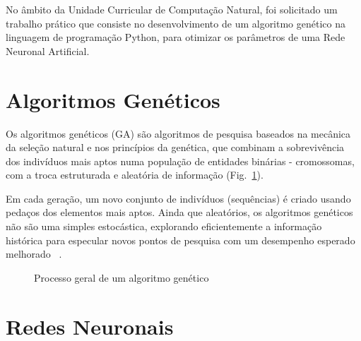 No âmbito da Unidade Curricular de Computação Natural, foi solicitado um trabalho prático que consiste no desenvolvimento de um algoritmo genético na linguagem de programação Python, para otimizar os parâmetros de uma Rede Neuronal Artificial.


\section{Algoritmos Genéticos}\label{sec:gen_algs}

Os algoritmos genéticos (GA) são algoritmos de pesquisa baseados na mecânica da seleção natural e nos princípios da genética, que combinam a sobrevivência dos indivíduos mais aptos numa população de entidades binárias - cromossomas, com a troca estruturada e aleatória de informação (Fig.~\ref{fig:ea_flowchart}).

Em cada geração, um novo conjunto de indivíduos (sequências) é criado usando pedaços dos elementos mais aptos.
Ainda que aleatórios, os algoritmos genéticos não são uma simples  estocástica, explorando eficientemente a informação histórica para especular novos pontos de pesquisa com um desempenho esperado melhorado ~\cite{Goldberg1989GeneticLearning}.

\begin{figure}[htbp]
    \centering
    \caption{Processo geral de um algoritmo genético}
    \label{fig:ea_flowchart}
\end{figure}


\section{Redes Neuronais}\label{sec:neural_nets}

